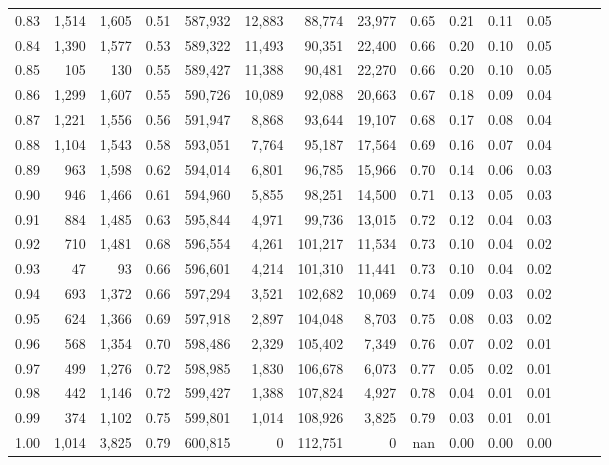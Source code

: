 \begin{tabular}{rrrrrrrrrrrrrrr}
0.83 &   1,514 &  1,605 &  0.51 &  587,932 &   12,883 &   88,774 &   23,977 &  0.65 &  0.21 &  0.11 &      0.05 \\
0.84 &   1,390 &  1,577 &  0.53 &  589,322 &   11,493 &   90,351 &   22,400 &  0.66 &  0.20 &  0.10 &      0.05 \\
0.85 &     105 &    130 &  0.55 &  589,427 &   11,388 &   90,481 &   22,270 &  0.66 &  0.20 &  0.10 &      0.05 \\
0.86 &   1,299 &  1,607 &  0.55 &  590,726 &   10,089 &   92,088 &   20,663 &  0.67 &  0.18 &  0.09 &      0.04 \\
0.87 &   1,221 &  1,556 &  0.56 &  591,947 &    8,868 &   93,644 &   19,107 &  0.68 &  0.17 &  0.08 &      0.04 \\
0.88 &   1,104 &  1,543 &  0.58 &  593,051 &    7,764 &   95,187 &   17,564 &  0.69 &  0.16 &  0.07 &      0.04 \\
0.89 &     963 &  1,598 &  0.62 &  594,014 &    6,801 &   96,785 &   15,966 &  0.70 &  0.14 &  0.06 &      0.03 \\
0.90 &     946 &  1,466 &  0.61 &  594,960 &    5,855 &   98,251 &   14,500 &  0.71 &  0.13 &  0.05 &      0.03 \\
0.91 &     884 &  1,485 &  0.63 &  595,844 &    4,971 &   99,736 &   13,015 &  0.72 &  0.12 &  0.04 &      0.03 \\
0.92 &     710 &  1,481 &  0.68 &  596,554 &    4,261 &  101,217 &   11,534 &  0.73 &  0.10 &  0.04 &      0.02 \\
0.93 &      47 &     93 &  0.66 &  596,601 &    4,214 &  101,310 &   11,441 &  0.73 &  0.10 &  0.04 &      0.02 \\
0.94 &     693 &  1,372 &  0.66 &  597,294 &    3,521 &  102,682 &   10,069 &  0.74 &  0.09 &  0.03 &      0.02 \\
0.95 &     624 &  1,366 &  0.69 &  597,918 &    2,897 &  104,048 &    8,703 &  0.75 &  0.08 &  0.03 &      0.02 \\
0.96 &     568 &  1,354 &  0.70 &  598,486 &    2,329 &  105,402 &    7,349 &  0.76 &  0.07 &  0.02 &      0.01 \\
0.97 &     499 &  1,276 &  0.72 &  598,985 &    1,830 &  106,678 &    6,073 &  0.77 &  0.05 &  0.02 &      0.01 \\
0.98 &     442 &  1,146 &  0.72 &  599,427 &    1,388 &  107,824 &    4,927 &  0.78 &  0.04 &  0.01 &      0.01 \\
0.99 &     374 &  1,102 &  0.75 &  599,801 &    1,014 &  108,926 &    3,825 &  0.79 &  0.03 &  0.01 &      0.01 \\
1.00 &   1,014 &  3,825 &  0.79 &  600,815 &        0 &  112,751 &        0 &   nan &  0.00 &  0.00 &      0.00 \\
\bottomrule
\end{tabular}
